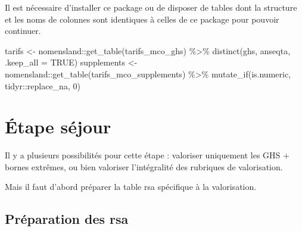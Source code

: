 \documentclass[
]{book}
\newenvironment{Shaded}{\begin{snugshade}}{\end{snugshade}}
\newcommand{\AttributeTok}[1]{\textcolor[rgb]{0.77,0.63,0.00}{#1}}
\newcommand{\ConstantTok}[1]{\textcolor[rgb]{0.00,0.00,0.00}{#1}}
\newcommand{\DecValTok}[1]{\textcolor[rgb]{0.00,0.00,0.81}{#1}}
\newcommand{\FunctionTok}[1]{\textcolor[rgb]{0.00,0.00,0.00}{#1}}
\newcommand{\NormalTok}[1]{#1}
\newcommand{\OtherTok}[1]{\textcolor[rgb]{0.56,0.35,0.01}{#1}}
\newcommand{\SpecialCharTok}[1]{\textcolor[rgb]{0.00,0.00,0.00}{#1}}
\newcommand{\StringTok}[1]{\textcolor[rgb]{0.31,0.60,0.02}{#1}}
\begin{document}
Il est nécessaire d'installer ce package ou de disposer de tables dont la structure et les noms de colonnes sont identiques à celles de ce package pour pouvoir continuer.

\begin{Shaded}
\begin{Highlighting}[]
\NormalTok{tarifs      }\OtherTok{\textless{}{-}}\NormalTok{ nomensland}\SpecialCharTok{::}\FunctionTok{get\_table}\NormalTok{(}\StringTok{\textquotesingle{}tarifs\_mco\_ghs\textquotesingle{}}\NormalTok{) }\SpecialCharTok{\%\textgreater{}\%} \FunctionTok{distinct}\NormalTok{(ghs, anseqta, }\AttributeTok{.keep\_all =} \ConstantTok{TRUE}\NormalTok{)}
\NormalTok{supplements }\OtherTok{\textless{}{-}}\NormalTok{ nomensland}\SpecialCharTok{::}\FunctionTok{get\_table}\NormalTok{(}\StringTok{\textquotesingle{}tarifs\_mco\_supplements\textquotesingle{}}\NormalTok{) }\SpecialCharTok{\%\textgreater{}\%} \FunctionTok{mutate\_if}\NormalTok{(is.numeric, tidyr}\SpecialCharTok{::}\NormalTok{replace\_na, }\DecValTok{0}\NormalTok{)}
\end{Highlighting}
\end{Shaded}

\hypertarget{uxe9tape-suxe9jour}{%
\section{Étape séjour}\label{uxe9tape-suxe9jour}}

Il y a plusieurs possibilités pour cette étape : valoriser uniquement les GHS + bornes extrêmes, ou bien valoriser l'intégralité des rubriques de valorisation.

Mais il faut d'abord préparer la table rsa spécifique à la valorisation.

\hypertarget{pruxe9paration-des-rsa}{%
\subsection{Préparation des rsa}\label{pruxe9paration-des-rsa}}
\end{document}
